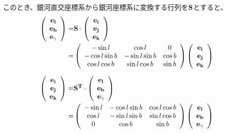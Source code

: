 このとき、銀河直交座標系から銀河座標系に変換する行列を$\bf{S}$とすると、
\begin{align}
\begin{aligned}
	\left(
	\begin{array}{c}
	 	\bf{e}_l\\
		\bf{e}_b\\
		\bf{e}_{\gamma}
	\end{array}
	\right)
	=& \bf{S} \cdot
	\left(
	\begin{array}{c}
	 	\bf{e}_i\\
	 	\bf{e}_j\\
	 	\bf{e}_k
	\end{array}
	\right)\\
	=&
	\left(
	\begin{array}{ccc}
	 	-\sin{l} & \cos{l} & 0\\
	 	-\cos{l}\sin{b} & -\sin{l}\sin{b} & \cos{b}\\
	 	\cos{l}\cos{b} & \sin{l}\cos{b} & \sin{b}
	\end{array}
	\right)
	\left(
	\begin{array}{c}
	 	\bf{e}_i\\
	 	\bf{e}_j\\
	 	\bf{e}_k
	\end{array}
	\right)
\end{aligned}
\end{align}

\begin{align}
\begin{aligned}
	\left(
	\begin{array}{c}
	 	\bf{e}_i\\
		\bf{e}_j\\
		\bf{e}_k
	\end{array}
	\right)
	=& \bf{S}^T \cdot
	\left(
	\begin{array}{c}
	 	\bf{e}_l\\
	 	\bf{e}_b\\
	 	\bf{e}_{\gamma}
	\end{array}
	\right)\\
	=&
	\left(
	\begin{array}{ccc}
	 	-\sin{l} & -\cos{l}\sin{b} & \cos{l}\cos{b}\\
	 	\cos{l} & -\sin{l}\sin{b} & \sin{l}\cos{b}\\
	 	0 & \cos{b} & \sin{b}
	\end{array}
	\right)
	\left(
	\begin{array}{c}
	 	\bf{e}_l\\
	 	\bf{e}_b\\
	 	\bf{e}_{\gamma}
	\end{array}
	\right)
\end{aligned}
\end{align}

